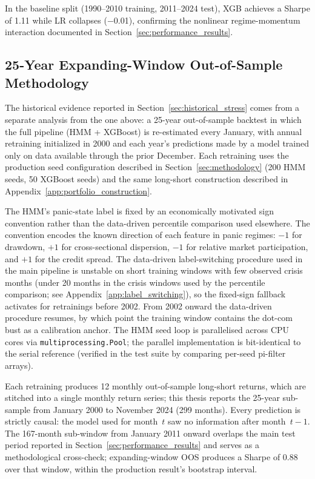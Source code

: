 

In the baseline split (1990--2010 training, 2011--2024 test), XGB achieves a Sharpe of 1.11 while LR collapses ($-$0.01), confirming the nonlinear regime-momentum interaction documented in Section~\ref{sec:performance_results}.

\subsection{25-Year Expanding-Window Out-of-Sample Methodology}\label{app:expanding_window}

The historical evidence reported in Section~\ref{sec:historical_stress} comes from a separate analysis from the one above: a 25-year out-of-sample backtest in which the full pipeline (HMM + XGBoost) is re-estimated every January, with annual retraining initialized in 2000 and each year's predictions made by a model trained only on data available through the prior December. Each retraining uses the production seed configuration described in Section~\ref{sec:methodology} (200 HMM seeds, 50 XGBoost seeds) and the same long-short construction described in Appendix~\ref{app:portfolio_construction}.

The HMM's panic-state label is fixed by an economically motivated sign convention rather than the data-driven percentile comparison used elsewhere. The convention encodes the known direction of each feature in panic regimes: $-1$ for drawdown, $+1$ for cross-sectional dispersion, $-1$ for relative market participation, and $+1$ for the credit spread. The data-driven label-switching procedure used in the main pipeline is unstable on short training windows with few observed crisis months (under 20 months in the crisis windows used by the percentile comparison; see Appendix~\ref{app:label_switching}), so the fixed-sign fallback activates for retrainings before 2002. From 2002 onward the data-driven procedure resumes, by which point the training window contains the dot-com bust as a calibration anchor. The HMM seed loop is parallelised across CPU cores via \texttt{multiprocessing.Pool}; the parallel implementation is bit-identical to the serial reference (verified in the test suite by comparing per-seed pi-filter arrays).

Each retraining produces 12 monthly out-of-sample long-short returns, which are stitched into a single monthly return series; this thesis reports the 25-year sub-sample from January 2000 to November 2024 (299 months). Every prediction is strictly causal: the model used for month~$t$ saw no information after month~$t-1$. The 167-month sub-window from January 2011 onward overlaps the main test period reported in Section~\ref{sec:performance_results} and serves as a methodological cross-check; expanding-window OOS produces a Sharpe of 0.88 over that window, within the production result's bootstrap interval.


